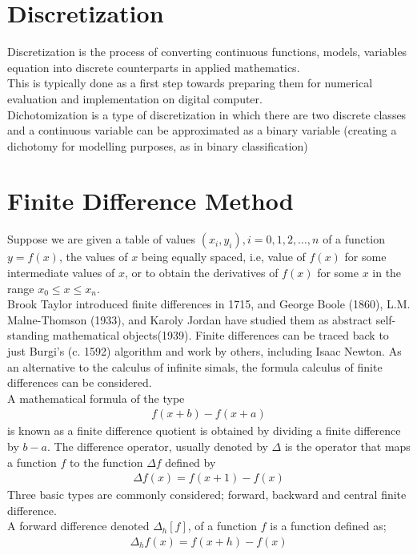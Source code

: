 \documentclass[11pt]{report}
\newcommand{\sps}{\\[0.2cm]}
\newcommand{\NI}{\noindent}
\begin{document}
	\section{Discretization}
	Discretization is the process of converting continuous functions, models, variables equation into discrete counterparts in applied mathematics.\sps
	This is typically done as a first step towards preparing them for numerical evaluation and implementation on digital computer.\sps
	Dichotomization is a type of discretization in which there are two discrete classes and a continuous variable can be approximated as a binary variable (creating a dichotomy for modelling purposes, as in binary classification)
	
	\section{Finite Difference Method}
	Suppose we are given a table of values $(x_i,y_i), i=0,1,2,\ldots,n$ of a function $y=f(x)$, the values of $x$ being equally spaced, i.e, value of $f(x)$ for some intermediate values of $x$, or to obtain the derivatives of $f(x)$ for some $x$ in the range $x_0 \leq x \leq x_n$.\sps
	Brook Taylor introduced finite differences in 1715, and George Boole (1860), L.M. Malne-Thomson (1933), and Karoly Jordan have studied them as abstract self-standing mathematical objects(1939). Finite differences can be traced back to just Burgi's (c. 1592) algorithm and work by others, including Isaac Newton. As an alternative to the calculus of infinite simals, the formula calculus of finite differences can be considered.\sps
	A mathematical formula of the type
	\begin{eqnarray}
		f(x+b)-f(x+a)
	\end{eqnarray}
	is known as a finite difference quotient is obtained by dividing a finite difference by $b-a$. The difference operator, usually denoted by $\Delta $ is the operator that maps a function $f$ to the function $\Delta f$ defined by
	\begin{eqnarray}
		\Delta f(x) = f(x+1) - f(x)
	\end{eqnarray}
	Three basic types are commonly considered; forward, backward and central finite difference.\sps
	
	\NI A forward difference denoted $\Delta_h[f]$, of a function $f$ is a function defined as;
	\begin{eqnarray}
		\Delta_h f(x) = f(x+h)-f(x)
	\end{eqnarray}
	
\end{document}
